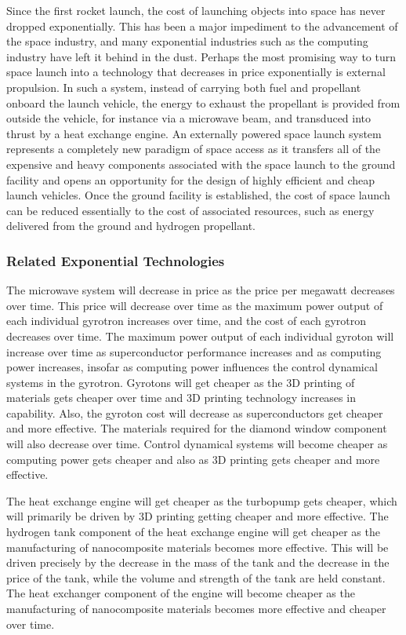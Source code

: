 \documentclass[letter,11pt]{article}
\begin{document}
Since the first rocket launch, the cost of launching objects into space has
never dropped exponentially.  This has been a major impediment to the
advancement of the space industry, and many exponential industries such as the
computing industry have left it behind in the dust.  Perhaps the most promising
way to turn space launch into a technology that decreases in price
exponentially is external propulsion. In such a system, instead of carrying
both fuel and propellant onboard the launch vehicle, the energy to exhaust the
propellant is provided from outside the vehicle, for instance via a microwave
beam, and transduced into thrust by a heat exchange engine. An externally
powered space launch system represents a completely new paradigm of space
access as it transfers all of the expensive and heavy components associated
with the space launch to the ground facility and opens an opportunity for the
design of highly efficient and cheap launch vehicles. Once the ground facility
is established, the cost of space launch can be reduced essentially to the cost
of associated resources, such as energy delivered from the ground and hydrogen
propellant.

\subsubsection{Related Exponential Technologies}

The microwave system will decrease in price as the price per megawatt decreases
over time.  This price will decrease over time as the maximum power output of
each individual \gls{gyrotron} increases over time, and the cost of each
gyrotron decreases over time.  The maximum power output of each individual
gyroton will increase over time as superconductor performance increases and as
computing power increases, insofar as computing power influences the control
dynamical systems in the gyrotron.  Gyrotons will get cheaper as the 3D
printing of materials gets cheaper over time and 3D printing technology
increases in capability.  Also, the gyroton cost will decrease as
superconductors get cheaper and more effective.  The materials required for the
diamond window component will also decrease over time.  Control dynamical
systems will become cheaper as computing power gets cheaper and also as 3D
printing gets cheaper and more effective.

The heat exchange engine will get cheaper as the turbopump gets cheaper, which
will primarily be driven by 3D printing getting cheaper and more effective.
The hydrogen tank component of the heat exchange engine will get cheaper as the
manufacturing of nanocomposite materials becomes more effective.  This will be
driven precisely by the decrease in the mass of the tank and the decrease in
the price of the tank, while the volume and strength of the tank are held
constant.  The heat exchanger component of the engine will become cheaper as
the manufacturing of nanocomposite materials becomes more effective and cheaper
over time.
\end{document}
